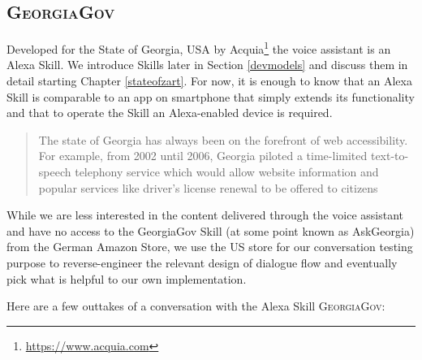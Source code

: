 \subsection{\textsc{GeorgiaGov}}
Developed for the State of Georgia, USA by Acquia\footnote{\url{https://www.acquia.com}} the voice assistant is an Alexa Skill. We introduce Skills later in Section \ref{devmodels} and discuss them in detail starting Chapter \ref{stateofzart}. For now, it is enough to know that an Alexa Skill is comparable to an app on smartphone that simply extends its functionality and that to operate the Skill an Alexa-enabled device is required.

\begin{quotation}
	\noindent The state of Georgia has always been on the forefront of web accessibility. For example, from 2002 until 2006, Georgia piloted a time-limited text-to-speech telephony service which would allow website information and popular services like driver's license renewal to be offered to citizens \cite{dries:georgia}
\end{quotation} 


While we are less interested in the content delivered through the voice assistant and have no access to the GeorgiaGov Skill (at some point known as AskGeorgia) from the German Amazon Store, we use the US store for our conversation testing purpose to reverse-engineer the relevant design of dialogue flow and eventually pick what is helpful to our own implementation. %

Here are a few outtakes of a conversation with the Alexa Skill \textsc{GeorgiaGov}:
%
\begin{flushright}
\end{flushright}


